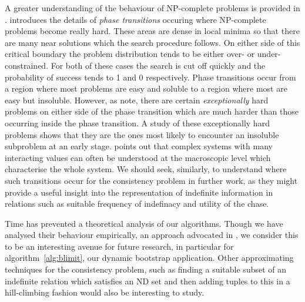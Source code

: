 \medskip
{}
A greater understanding of the behaviour of NP-complete problems
is provided in \cite{slm92,msl92}.  \cite{ckt91} introduces
the details of {\em phase transitions} occuring where NP-complete
problems become really hard.  These areas are dense in local
minima so that there are many near solutions which the search procedure
follows.  On either side of this critical boundary the 
problem distribution tends to be either over- or under- constrained.
For both of these cases the search is cut off quickly and the 
probability of success tends to 1 and 0 respectively. Phase
transitions  occur from a region where
most problems are easy and soluble to a region where most are
easy but insoluble. However, as \cite{sg94} note, there are
certain {\em exceptionally} hard problems on either side
of the phase transition which are much harder than those occurring
inside the phase transition. A study of these exceptionally
hard problems shows that they are the ones most likely to
encounter an insoluble subproblem at an early stage. \cite{ckt91}
points out that complex systems with many
interacting values can often be understood at the
macroscopic level which characterise the whole system.
We should seek, similarly, 
to understand where such transitions occur for the consistency
problem in further work, as they might provide a useful insight into
the representation of indefinite information in relations such as
suitable frequency of indefinacy and utility of the chase.

\medskip

Time has prevented a theoretical analysis of our algorithms. Though we
have analysed their behaviour empirically, an approach advocated in
\cite{hoo94}, we consider this to be an interesting avenue for future
research, in particular for algorithm~\ref{alg:blimit}, our dynamic
bootstrap application. Other approximating techniques for the
consistency problem, such as finding a suitable subset of an
indefinite relation which satisfies an ND set and then adding tuples
to this in a hill-climbing fashion would also be interesting to study.
 

